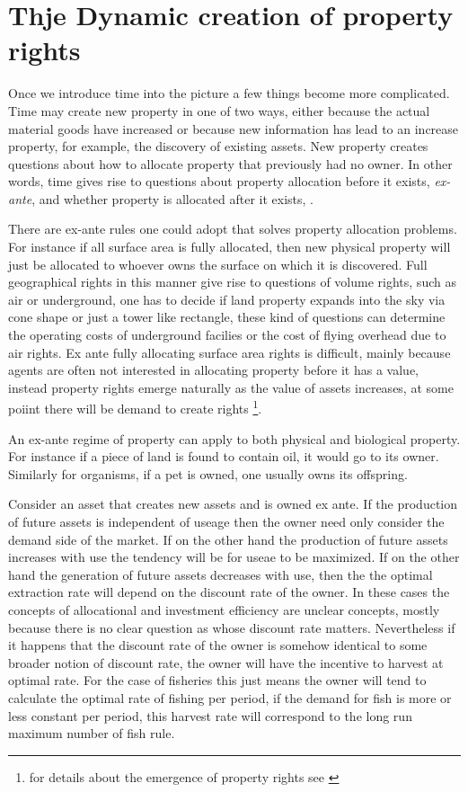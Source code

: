 \documentclass[12pt]{article}
\numberwithin{equation}{section}
\begin{document}
\newpage

\section{Thje Dynamic creation of property rights}

Once we introduce time into the picture a few things become more complicated. Time may create new property in one of two ways, either because the actual material goods have increased or because new information has lead to an increase property, for example, the discovery of existing assets. New property creates questions about how to allocate property that previously had no owner. In other words, time gives rise to questions about property allocation before it exists, \textit{ex-ante}, and whether property is allocated after it exists, . 

There are ex-ante rules one could adopt that solves property allocation problems.  For instance if all surface area is fully allocated, then new physical property will just be allocated to whoever owns the surface on which it is discovered. Full geographical rights in this manner give rise to questions of volume rights, such as air or underground, one has to decide if land property expands into the sky via cone shape or just a tower like rectangle, these kind of questions can determine the operating costs of underground facilies or the cost of flying overhead due to air rights.  Ex ante fully allocating surface area rights is  difficult, mainly because agents are often not interested in allocating property before it has a value, instead property rights emerge naturally as the value of assets increases, at some poiint there will be demand to create rights \footnote{for details about the emergence of property rights see \cite{Alchian1973}}. 

An ex-ante regime of property can apply to both physical and biological property. For instance if a piece of land is found to contain oil, it would go to its owner. Similarly for organisms, if a pet is owned, one usually owns its offspring.

Consider an asset that creates new assets and is owned ex ante. If the production of future assets is independent of useage then the owner need only consider the demand side of the market. If on the other hand the production of future assets increases with use the tendency will be for useae to be maximized. If on the other hand the generation of future assets decreases with use, then the the optimal extraction rate will depend on the discount rate of the owner. In these cases the concepts of allocational and investment efficiency are unclear concepts, mostly because there is no clear question as whose discount rate matters. Nevertheless if it happens that the discount rate of the owner is somehow identical to some broader notion of discount rate, the owner will have the incentive to harvest at optimal rate. For the case of fisheries this just means the owner will tend to calculate the optimal rate of fishing per period, if the demand for fish is more or less constant per period, this harvest rate will correspond to the long run maximum number of fish rule.  
\end{document}
